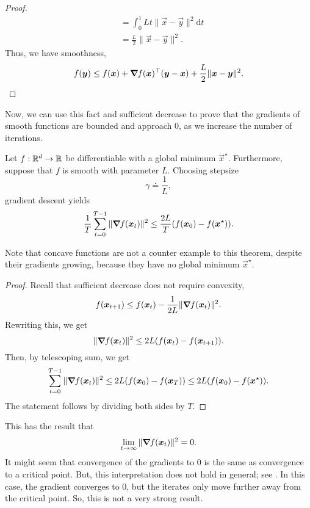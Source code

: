 \begin{proof}
\begin{align*}
         & = \int_0^1 Lt \| \vec{x} - \vec{y} \|^2 \mathrm{d}t                                                                                                                                           \\
         & = \frac{L}{2} \| \vec{x} - \vec{y} \|^2.
    \end{align*}
    Thus, we have smoothness, \[
        f(\bm{y}) \leq f(\bm{x}) + \bm{\nabla}_{\! } f(\bm{x})^\top (\bm{y} - \bm{x}) + \frac{L}{2} \| \bm{x} - \bm{y} \|^2.
    \]
\end{proof}

Now, we can use this fact and sufficient decrease to prove that the gradients of smooth functions are bounded and approach 0, as
we increase the number of iterations.

\begin{theorem}
    Let $f: \mathbb{R}^d \to \mathbb{R}$ be differentiable with a global minimum $\vec{x}^\star$. Furthermore, suppose that $f$ is smooth with parameter $L$. Choosing stepsize \[
        \gamma \doteq \frac{1}{L},
    \]
    gradient descent yields \[
        \frac{1}{T} \sum_{t=0}^{T-1} \| \bm{\nabla}_{\! } f(\bm{x}_t) \|^2 \leq \frac{2L}{T} (f(\bm{x}_0) - f(\bm{x}^\star)).
    \]
\end{theorem}

\begin{remark}
    Note that concave functions are not a counter example to this theorem, despite their gradients
    growing, because they have no global minimum $\vec{x}^\star$.
\end{remark}

\begin{proof}
    Recall that sufficient decrease does not require convexity, \[
        f(\bm{x}_{t+1}) \leq f(\bm{x}_t) - \frac{1}{2L} \| \bm{\nabla}_{\! } f(\bm{x}_t) \|^2.
    \]
    Rewriting this, we get \[
        \| \bm{\nabla}_{\! } f(\bm{x}_t) \|^2 \leq 2L (f(\bm{x}_t) - f(\bm{x}_{t+1})).
    \]
    Then, by telescoping sum, we get \[
        \sum_{t=0}^{T-1} \| \bm{\nabla}_{\! } f(\bm{x}_t) \|^2 \leq 2L (f(\bm{x}_0) - f(\bm{x}_T)) \leq 2L (f(\bm{x}_0) - f(\bm{x}^\star)).
    \]
    The statement follows by dividing both sides by $T$.
\end{proof}

This has the result that \[
    \lim_{t \to \infty} \| \bm{\nabla}_{\! } f(\bm{x}_t) \|^2 = 0.
\]
It might seem that convergence of the gradients to 0 is the same as convergence to a critical
point. But, this interpretation does not hold in general; see . In this
case, the gradient converges to 0, but the iterates only move further away from the critical point.
So, this is not a very strong result.

